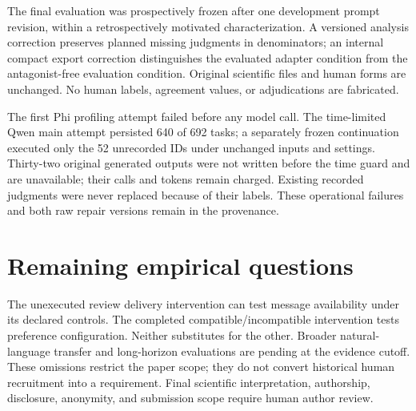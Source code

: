 The final evaluation was prospectively frozen after one development prompt revision, within a retrospectively motivated characterization. A versioned analysis correction preserves planned missing judgments in denominators; an internal compact export correction distinguishes the evaluated adapter condition from the antagonist-free evaluation condition. Original scientific files and human forms are unchanged. No human labels, agreement values, or adjudications are fabricated.

The first Phi profiling attempt failed before any model call. The time-limited Qwen main attempt persisted 640 of 692 tasks; a separately frozen continuation executed only the 52 unrecorded IDs under unchanged inputs and settings. Thirty-two original generated outputs were not written before the time guard and are unavailable; their calls and tokens remain charged. Existing recorded judgments were never replaced because of their labels. These operational failures and both raw repair versions remain in the provenance.

\section{Remaining empirical questions}

The unexecuted review delivery intervention can test message availability under its declared controls. The completed compatible/incompatible intervention tests preference configuration. Neither substitutes for the other. Broader natural-language transfer and long-horizon evaluations are pending at the evidence cutoff. These omissions restrict the paper scope; they do not convert historical human recruitment into a requirement. Final scientific interpretation, authorship, disclosure, anonymity, and submission scope require human author review.
